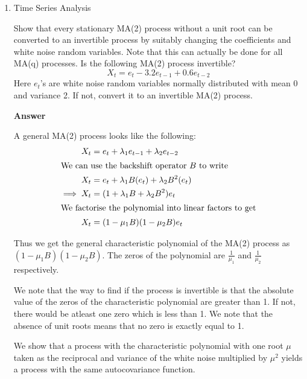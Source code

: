 \documentclass[12pt, oneside]{article}
\begin{document}
\begin{enumerate}
{    Thus we see that 90\% of the variation in \(Y\) is explained by the variations 
    in \(X_2\) and \(X_3\) through this model.
}


\item {
    Time Series Analysis

    Show that every stationary MA(2) process without a unit root can be converted to an invertible
    process by suitably changing the coefficients and white noise random variables.
    Note that this can actually be done for all MA(q) processes. Is the following
    MA(2) process invertible?
    \[X_t = e_t - 3.2 e_{t-1} + 0.6 e_{t-2}\]
    Here \(e_t\)'s are white noise random variables normally distributed with mean
    0 and variance 2. If not, convert it to an invertible MA(2) process.

    \textbf{Answer}

    A general MA(2) process looks like the following:
    \begin{align*}
        X_t &= e_t + \lambda_1 e_{t-1} + \lambda_2 e_{t-2} \\
        \intertext{We can use the backshift operator \(B\) to write}
        X_t &= e_t + \lambda_1 B(e_{t}) + \lambda_2 B^2(e_{t}) \\
        \implies X_t &= (1 + \lambda_1 B + \lambda_2 B^2) e_{t} \\
        \intertext{We factorise the polynomial into linear factors to get}
        X_t &= (1 - \mu_1 B)(1 - \mu_2 B) e_t
    \end{align*}

    Thus we get the general characteristic polynomial of the MA(2) process as
    \((1 - \mu_1 B)(1 - \mu_2 B)\). The zeros of the polynomial are \(\frac{1}{\mu_1}\)
    and \(\frac{1}{\mu_2}\) respectively.

    We note that the way to find if the process is invertible is that the absolute
    value of the zeros of the characteristic polynomial are greater than 1. If not, there would be atleast one zero which is less than 1. We note that the
    absence of unit roots means that no zero is exactly equal to 1.

    We show that a process with the characteristic polynomial with one root \(\mu\) taken
    as the reciprocal and variance of the white noise multiplied by \(\mu^2\) yields
    a process with the same autocovariance function.

}
\end{enumerate}
\end{document}

